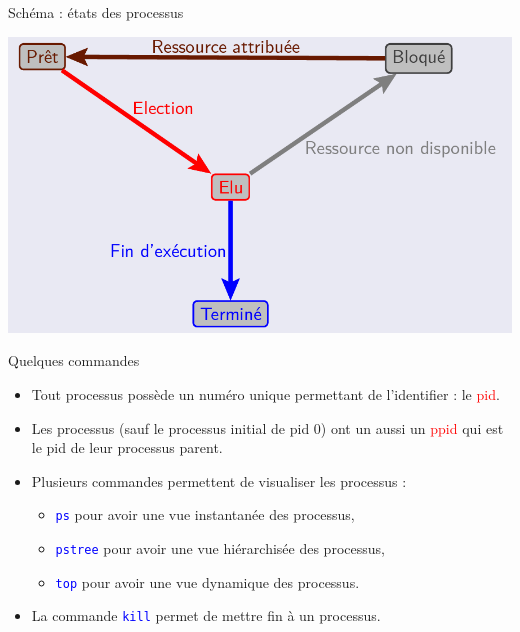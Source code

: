 \documentclass[10pt]{beamer}
\begin{document}
\begin{frame}
	\mframe{\Processus}
	\begin{block}{Schéma : états des processus}
			\begin{center}
		\includegraphics[scale=0.25]{../../Archi_Materielle/data/etats_processus_5}
		\end{center}
	\end{block}
\end{frame}

\begin{frame}
	\mframe{\Processus}
	\begin{block}{Quelques commandes}
		\begin{itemize}[label=\textbullet]
			\item<2-> Tout processus possède un numéro unique permettant de l'identifier : le \textcolor{red}{{\sc pid}}.
			\item<3-> Les processus (sauf le processus initial de {\sc pid} 0) ont un aussi un \textcolor{red}{{\sc ppid}} qui est le {\sc pid} de leur processus parent.
			\item<4-> Plusieurs commandes permettent de visualiser les processus :
			\begin{itemize}
				\item<5-> \textcolor{blue}{\tt ps} pour avoir une vue instantanée des processus,
				\item<6-> \textcolor{blue}{\tt pstree} pour avoir une vue hiérarchisée des processus,
				\item<7-> \textcolor{blue}{\tt top} pour avoir une vue dynamique des processus.
			\end{itemize}
			\item<8-> La commande \textcolor{blue}{\tt kill} permet de mettre fin à un processus.
		\end{itemize}
	\end{block}
\end{frame}
\end{document}
